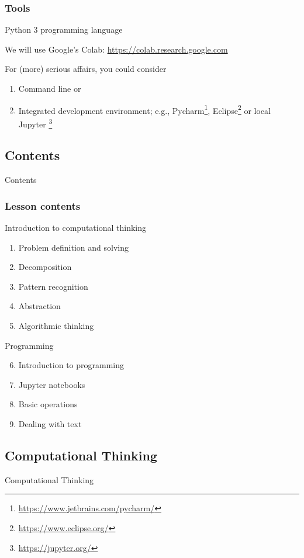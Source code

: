 \documentclass[xcolor=x11names,handout]{beamer}
\begin{document}
\begin{frame}
\frametitle{Tools}

\alert{Python 3} programming language

We will use Google's Colab: \url{https://colab.research.google.com}
\bigskip 

For (more) serious affairs, you could consider
\begin{enumerate}
	\item Command line \alert{or}
	\item Integrated development environment; e.g.,
	Pycharm\footnote{\url{https://www.jetbrains.com/pycharm/}},
	Eclipse\footnote{\url{https://www.eclipse.org/}} \alert{or}
	local Jupyter%
\footnote{\url{https://jupyter.org/}}
\end{enumerate}
\end{frame}

\begin{frame}
\section{Contents}
\centering
\alert{Contents}
\end{frame}

\begin{frame}
 \frametitle{Lesson contents}
\alert{Introduction to computational thinking}

\begin{enumerate}
 \item Problem definition and solving
 \item Decomposition
 \item Pattern recognition
 \item Abstraction
 \item Algorithmic thinking
\end{enumerate}
\bigskip 	\pause 

\alert{Programming}
\begin{enumerate}\setcounter{enumi}{5}
 \item Introduction to programming
 \item Jupyter notebooks
 \item Basic operations
 \item Dealing with text
\end{enumerate}
\end{frame}


\begin{frame}
\section{Computational Thinking}
\centering
\alert{Computational Thinking}
\end{frame}
\end{document}
